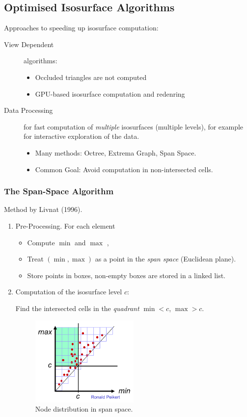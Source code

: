 \subsection{Optimised Isosurface Algorithms}
Approaches to speeding up isosurface computation:
\begin{description}
\item[View Dependent] algorithms:
    \begin{itemize}
        \item Occluded triangles are not computed
        \item GPU-based isosurface computation and redenring
    \end{itemize}
\item[Data Processing] for fast computation of \emph{multiple} isosurfaces (multiple levels), for example for interactive exploration of the data.
    \begin{itemize}
        \item Many methods: Octree, Extrema Graph, Span Space.
        \item Common Goal: Avoid computation in non-intersected cells.
    \end{itemize}
\end{description}

\subsubsection{The Span-Space Algorithm}
Method by Livnat (1996).
\begin{enumerate}
\item Pre-Processing. For each element
    \begin{itemize}
        \item Compute $\min$ and $\max$ ,
        \item Treat $(\min,\max)$ as a point in the \emph{span space} (Euclidean plane).
        \item Store points in boxes, non-empty boxes are stored in a linked list.
    \end{itemize}
\item Computation of the isosurface level $c$:

    Find the intersected cells in the \emph{quadrant} $\min < c$, $\max > c$.
    \begin{figure}[H]
    \centering
        \includegraphics[width=0.5\textwidth]{img/02_span_space_algorithm}    
        \caption{Node distribution in span space.}
    \end{figure}

\end{enumerate}

